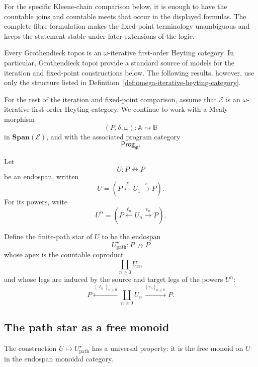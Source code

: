 \begin{remark}
\label{rem:omega-iterative-hypothesis-strength}
For the specific Kleene-chain comparison below, it is enough to have the countable joins and countable meets that occur in the displayed formulas. The complete-fibre formulation makes the fixed-point terminology unambiguous and keeps the statement stable under later extensions of the logic.
\end{remark}

\begin{example}
\label{ex:grothendieck-topos-omega-iterative}
Every Grothendieck topos is an \(\omega\)-iterative first-order Heyting category. In particular, Grothendieck topoi provide a standard source of models for the iteration and fixed-point constructions below. The following results, however, use only the structure listed in Definition~\ref{def:omega-iterative-heyting-category}.
\end{example}

For the rest of the iteration and fixed-point comparison, assume that \(\mathcal E\) is an \(\omega\)-iterative first-order Heyting category. We continue to work with a Mealy morphism
\[
(P,\delta,\omega):\mathbb A\rightsquigarrow\mathbb B
\]
in \(\mathbf{Span}(\mathcal E)\), and with the associated program category
\[
\mathsf{Prog}_\Phi.
\]

Let
\[
U:P\nrightarrow P
\]
be an endospan, written
\[
U=
\left(
P\xleftarrow{\ell}U_1\xrightarrow{r}P
\right).
\]
For its powers, write
\[
U^n=
\left(
P\xleftarrow{\ell_n}U_n\xrightarrow{r_n}P
\right).
\]

\begin{definition}
\label{def:path-star-span}
Define the finite-path star of \(U\) to be the endospan
\[
U^\star_{\mathrm{path}}:P\nrightarrow P
\]
whose apex is the countable coproduct
\[
\coprod_{n\ge0}U_n,
\]
and whose legs are induced by the source and target legs of the powers \(U^n\):
\[
P
\xleftarrow{\,[\ell_n]_{n\ge0}\,}
\coprod_{n\ge0}U_n
\xrightarrow{\,[r_n]_{n\ge0}\,}
P.
\]
\end{definition}

\subsection{The path star as a free monoid}

The construction \(U\mapsto U^\star_{\mathrm{path}}\) has a universal property: it is the free monoid on \(U\) in the endospan monoidal category.


